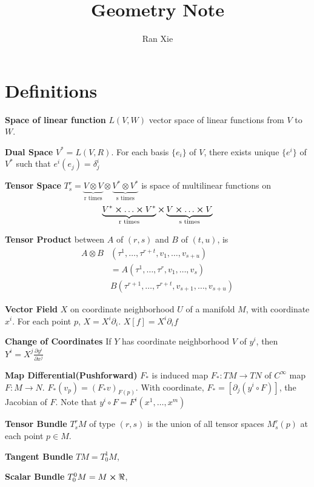 \documentclass[12pt]{article}
\title{Geometry Note}
\author{Ran Xie}
\begin{document}
\maketitle

\twocolumn
\section{Definitions}

\textbf{Space of linear function} $L(V, W)$ vector space of linear functions from $V$ to $W$.

\textbf{Dual Space} $V^* = L(V, R)$. For each basis $\{e_i\}$ of $V$, there exists unique $\{e^i\}$ of $V^*$ such that $e^i (e_j) = \delta^i_j$

\textbf{Tensor Space} $T^r_s = \underbrace{V \otimes V}_\text{r times} \otimes \underbrace{V^* \otimes V^*}_\text{s times}  $  is space of multilinear functions on $$\underbrace{V^* \cross \ldots \cross V^*}_\text{r times} \cross \underbrace{V \cross \ldots \cross V}_\text{s times}$$

\textbf{Tensor Product} between $A$ of $(r,s)$ and $B$ of $(t, u)$,  is $$\begin{aligned}  A \otimes B &(\tau^1,\ldots, \tau^{r+t}, v_1,\ldots, v_{s+u}) \\ & = A(\tau^1, \ldots, \tau^r, v_1, \ldots, v_s) \\ &B(\tau^{r+1}, \ldots , \tau^{r+t}, v_{s+1}, \ldots, v_{s+u})\end{aligned}$$

\textbf{Vector Field} $X$ on coordinate neighborhood $U$ of a manifold $M$,  with coordinate $x^i$. For each point $p$, $X = X^i \partial_i$.  $X[f] = X^i \partial_i f$

\textbf{Change of Coordinates} If $Y$ has coordinate neighborhood $V$ of $y^i$, then $Y^i = X^j \frac{\partial y^i }{\partial x^j}$

\textbf{Map Differential(Pushforward)} $F_*$ is induced map $F_*: TM \rightarrow TN$ of $C^\infty$ map $F: M\rightarrow N$. $F_* (v_p) = (F_*v)_{F(p)}$. With coordinate, $F_* = [ \partial_j ( y^i \circ F ) ]$, the Jacobian of $F$. Note that $y^i \circ F = F^i(x^1, \ldots, x^m)$

\textbf{Tensor Bundle} $T^r_s M$  of type $(r,s)$ is the union of all tensor spaces $M^r_s(p)$ at each point $p \in M$.  

\textbf{Tangent Bundle} $TM=T^1_0M$, 

\textbf{Scalar Bundle} $T^0_0M = M \cross \real$, 
\end{document}
